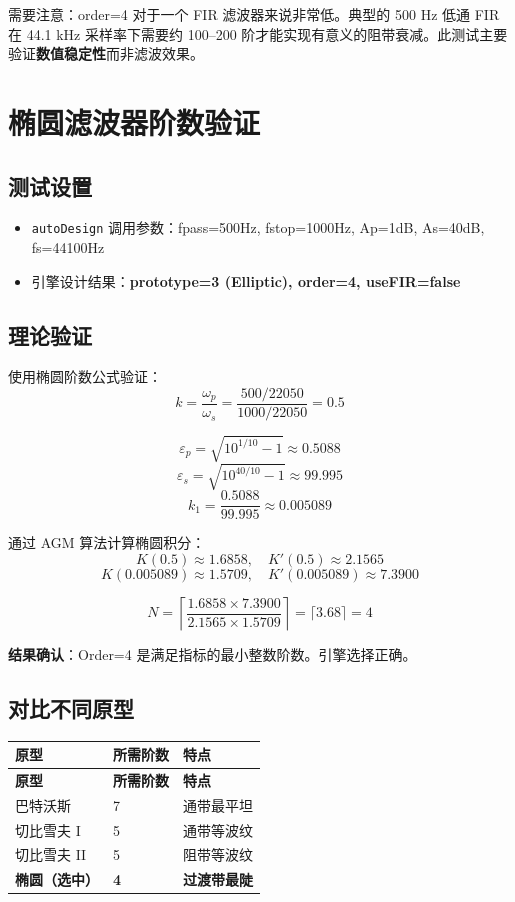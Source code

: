 ﻿\documentclass[12pt,a4paper,oneside]{ctexbook}
\begin{document}
需要注意：order=4 对于一个 FIR 滤波器来说非常低。典型的 500 Hz 低通 FIR 在 44.1 kHz 采样率下需要约 100--200 阶才能实现有意义的阻带衰减。此测试主要验证\textbf{数值稳定性}而非滤波效果。

\section{椭圆滤波器阶数验证}

\subsection{测试设置}

\begin{itemize}
    \item \texttt{autoDesign} 调用参数：fpass=500Hz, fstop=1000Hz, Ap=1dB, As=40dB, fs=44100Hz
    \item 引擎设计结果：\textbf{prototype=3 (Elliptic), order=4, useFIR=false}
\end{itemize}

\subsection{理论验证}

使用椭圆阶数公式验证：
\[
k = \frac{\omega_p}{\omega_s} = \frac{500/22050}{1000/22050} = 0.5
\]

\[
\varepsilon_p = \sqrt{10^{1/10} - 1} \approx 0.5088
\]
\[
\varepsilon_s = \sqrt{10^{40/10} - 1} \approx 99.995
\]
\[
k_1 = \frac{0.5088}{99.995} \approx 0.005089
\]

通过 AGM 算法计算椭圆积分：
\[
K(0.5) \approx 1.6858, \quad K'(0.5) \approx 2.1565
\]
\[
K(0.005089) \approx 1.5709, \quad K'(0.005089) \approx 7.3900
\]

\[
N = \left\lceil \frac{1.6858 \times 7.3900}{2.1565 \times 1.5709} \right\rceil = \lceil 3.68 \rceil = 4
\]

\textbf{结果确认}：Order=4 是满足指标的最小整数阶数。引擎选择正确。

\subsection{对比不同原型}

\begin{longtable}{p{3cm}p{3cm}p{5cm}}
    \toprule
    \textbf{原型} & \textbf{所需阶数} & \textbf{特点} \\
    \midrule
    \endfirsthead
    \toprule
    \textbf{原型} & \textbf{所需阶数} & \textbf{特点} \\
    \midrule
    \endhead
    \bottomrule
    \endfoot
    巴特沃斯 & 7 & 通带最平坦 \\
    切比雪夫 I & 5 & 通带等波纹 \\
    切比雪夫 II & 5 & 阻带等波纹 \\
    \textbf{椭圆（选中）} & \textbf{4} & \textbf{过渡带最陡} \\
    \bottomrule
\end{longtable}
\end{document}
